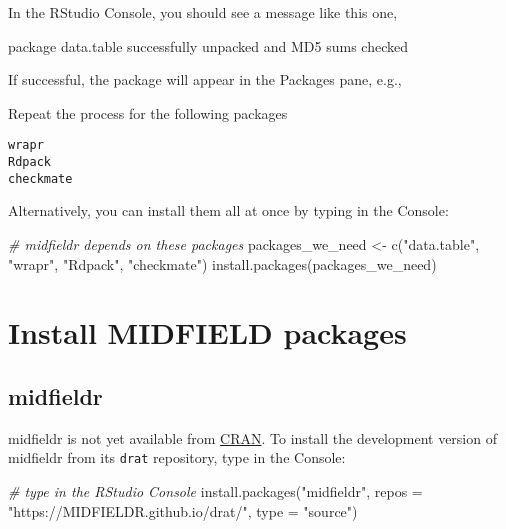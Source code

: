 \documentclass[
]{book}
\newenvironment{Shaded}{\begin{snugshade}}{\end{snugshade}}
\newcommand{\AttributeTok}[1]{\textcolor[rgb]{0.77,0.63,0.00}{#1}}
\newcommand{\CommentTok}[1]{\textcolor[rgb]{0.56,0.35,0.01}{\textit{#1}}}
\newcommand{\FunctionTok}[1]{\textcolor[rgb]{0.00,0.00,0.00}{#1}}
\newcommand{\NormalTok}[1]{#1}
\newcommand{\OtherTok}[1]{\textcolor[rgb]{0.56,0.35,0.01}{#1}}
\newcommand{\StringTok}[1]{\textcolor[rgb]{0.31,0.60,0.02}{#1}}
\begin{document}
In the RStudio Console, you should see a message like this one,

\begin{Shaded}
\begin{Highlighting}[]
\NormalTok{    package }\StringTok{\textquotesingle{}data.table\textquotesingle{}}\NormalTok{ successfully unpacked and MD5 sums checked}
\end{Highlighting}
\end{Shaded}

If successful, the package will appear in the Packages pane, e.g.,

Repeat the process for the following packages

\begin{verbatim}
wrapr 
Rdpack 
checkmate
\end{verbatim}

Alternatively, you can install them all at once by typing in the Console:

\begin{Shaded}
\begin{Highlighting}[]
\CommentTok{\# midfieldr depends on these packages}
\NormalTok{packages\_we\_need }\OtherTok{\textless{}{-}} \FunctionTok{c}\NormalTok{(}\StringTok{"data.table"}\NormalTok{, }\StringTok{"wrapr"}\NormalTok{, }\StringTok{"Rdpack"}\NormalTok{, }\StringTok{"checkmate"}\NormalTok{)}
\FunctionTok{install.packages}\NormalTok{(packages\_we\_need)}
\end{Highlighting}
\end{Shaded}

\hypertarget{install-midfield-packages}{%
\section{Install MIDFIELD packages}\label{install-midfield-packages}}

\hypertarget{midfieldr}{%
\subsection{midfieldr}\label{midfieldr}}

midfieldr is not yet available from \href{https://cran.r-project.org/}{CRAN}. To install the development version of midfieldr from its \texttt{drat} repository, type in the Console:

\begin{Shaded}
\begin{Highlighting}[]
\CommentTok{\# type in the RStudio Console }
\FunctionTok{install.packages}\NormalTok{(}\StringTok{"midfieldr"}\NormalTok{, }
                 \AttributeTok{repos =} \StringTok{"https://MIDFIELDR.github.io/drat/"}\NormalTok{, }
                 \AttributeTok{type =} \StringTok{"source"}\NormalTok{)}
\end{Highlighting}
\end{Shaded}
\end{document}

